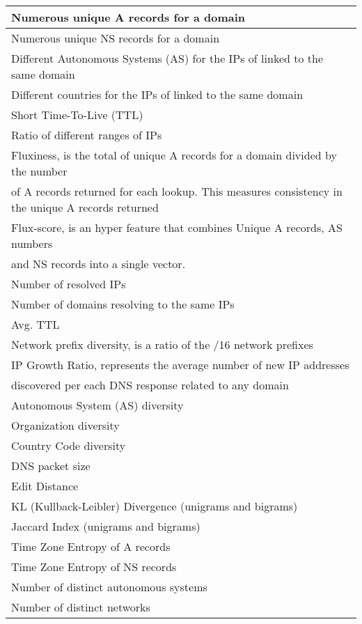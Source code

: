 \begin{tabular}{|l|}
\hline
Numerous unique A records for a domain\\
\hline
Numerous unique NS records for a  domain\\
\hline
Different Autonomous Systems (AS) for the IPs of linked to the same domain\\
\hline
Different countries for the IPs of linked to the same domain\\
\hline
Short Time-To-Live (TTL)\\
\hline
Ratio of different ranges of IPs\\
\hline
Fluxiness, is the total of unique A records for a domain divided by the number \\of A records returned for each lookup. This measures consistency in the unique A records returned \\
\hline
Flux-score, is an hyper feature that combines Unique A records, AS numbers \\and NS records into a single vector.\\
\hline
Number of resolved IPs\\
\hline
Number of domains resolving to the same IPs\\
\hline
Avg. TTL\\
\hline
Network prefix diversity, is a ratio of the /16 network prefixes \\
\hline
IP Growth Ratio, represents the average number of new IP addresses \\discovered per each DNS response related to any domain\\
\hline
Autonomous System (AS) diversity\\
\hline
Organization diversity\\
\hline
Country Code diversity\\
\hline
DNS packet size\\
\hline
Edit Distance\\
\hline
KL (Kullback-Leibler) Divergence (unigrams and bigrams)\\
\hline
Jaccard Index (unigrams and bigrams)\\
\hline
Time Zone Entropy of A records\\
\hline
Time Zone Entropy of NS records\\
\hline
Number of distinct autonomous systems\\
\hline
Number of distinct networks\\
\hline
 \end{tabular}

